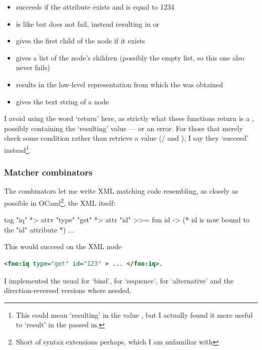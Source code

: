 \documentclass[12pt,a4paper,twoside,openright]{report}
\begin{document}
{\begin{itemize}
  \item {} succeeds if the  attribute exists and is equal to 1234

  \item {} is like  but does not fail, instead resulting in  or 

  \item {} gives the first child of the node if it exists

  \item {} gives a list of the node's children (possibly the empty list, so this one also never fails)

  \item {} results in the low-level  representation from which the  was obtained

  \item {} gives the text string of a  node
\end{itemize}

I avoid using the word `return' here, as strictly what these functions return is a , possibly containing the `resulting' value --- or an error. For those that merely check some condition rather than retrieve a value (/ and ), I say they `succeed' instead\footnote{This could mean `resulting' in the value \code{()}, but I actually found it more useful to `result' in the  passed in.}.

\subsubsection{Matcher combinators}
The combinators let me write XML matching code resembling, as closely as possible in OCaml\footnote{Short of syntax extensions perhaps, which I am unfamiliar with}, the XML itself:

\begin{ocaml}
tag "iq" *> attv "type" "get" *> attr "id" >>= fun id ->
  (* id is now bound to the "id" attribute *)
  ...
\end{ocaml}

This would succeed on the XML node
\begin{lstlisting}[language=xml]
<foo:iq type="get" id="123" > ... </foo:iq>.
\end{lstlisting}

I implemented the usual \code{>>=} for `bind', \code{*>} for `sequence', \code{<|>} for `alternative' and the direction-reversed versions where needed.

}
\end{document}
